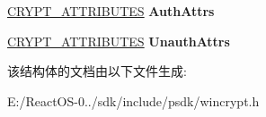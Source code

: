 \begin{DoxyCompactItemize}
\item 
\mbox{\label{struct___c_m_s_g___c_m_s___s_i_g_n_e_r___i_n_f_o_aa392bb4e10e4dce8768d0712d346e9be}} 
\hyperlink{struct___c_r_y_p_t___a_t_t_r_i_b_u_t_e_s}{C\+R\+Y\+P\+T\+\_\+\+A\+T\+T\+R\+I\+B\+U\+T\+ES} {\bfseries Auth\+Attrs}
\item 
\mbox{\label{struct___c_m_s_g___c_m_s___s_i_g_n_e_r___i_n_f_o_a76f081b1703277450df5aa4d568076ac}} 
\hyperlink{struct___c_r_y_p_t___a_t_t_r_i_b_u_t_e_s}{C\+R\+Y\+P\+T\+\_\+\+A\+T\+T\+R\+I\+B\+U\+T\+ES} {\bfseries Unauth\+Attrs}
\end{DoxyCompactItemize}


该结构体的文档由以下文件生成\+:\begin{DoxyCompactItemize}
\item 
E\+:/\+React\+O\+S-\/0../sdk/include/psdk/wincrypt.\+h\end{DoxyCompactItemize}
